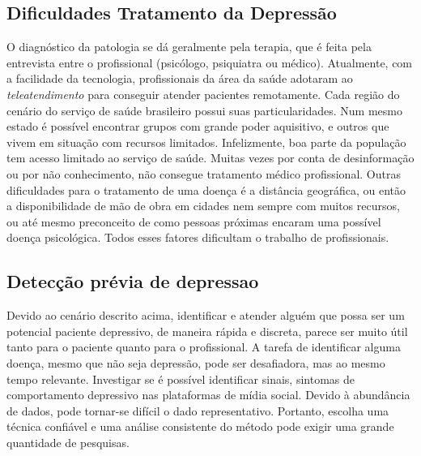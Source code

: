 \documentclass[11pt, notitlepage]{article} %
\begin{document}
\subsection*{Dificuldades Tratamento da Depressão}
O diagnóstico da patologia se dá geralmente pela terapia, que é feita pela entrevista entre o profissional (psicólogo, psiquiatra ou médico). Atualmente, com a facilidade da tecnologia, profissionais da área da saúde adotaram ao \emph{teleatendimento} para conseguir atender pacientes remotamente. 
Cada região do cenário do serviço de saúde brasileiro possui suas particularidades. Num mesmo estado é possível encontrar grupos com grande poder aquisitivo, e outros que vivem em situação com recursos limitados.
Infelizmente, boa parte da população tem acesso limitado ao serviço de saúde. Muitas vezes por conta de desinformação ou por não conhecimento, não consegue tratamento médico profissional. Outras dificuldades para o tratamento de uma doença é a distância geográfica, ou então a disponibilidade de mão de obra em cidades nem sempre com muitos recursos, ou até mesmo preconceito de como pessoas próximas encaram uma possível doença psicológica. Todos esses fatores dificultam o trabalho de profissionais.

\subsection*{Detecção prévia de depressao}
Devido ao cenário descrito acima, identificar e atender alguém que possa ser um potencial paciente depressivo, de maneira rápida e discreta, parece ser muito útil tanto para o paciente quanto para o profissional. 
A tarefa de identificar alguma doença, mesmo que não seja depressão, pode ser desafiadora, mas ao mesmo tempo relevante. Investigar se é possível identificar sinais, sintomas de comportamento depressivo nas plataformas de mídia social. 
Devido à abundância de dados, pode tornar-se difícil o dado representativo. Portanto, escolha uma técnica confiável e uma análise consistente do método pode exigir uma grande quantidade de pesquisas.


\end{document}
